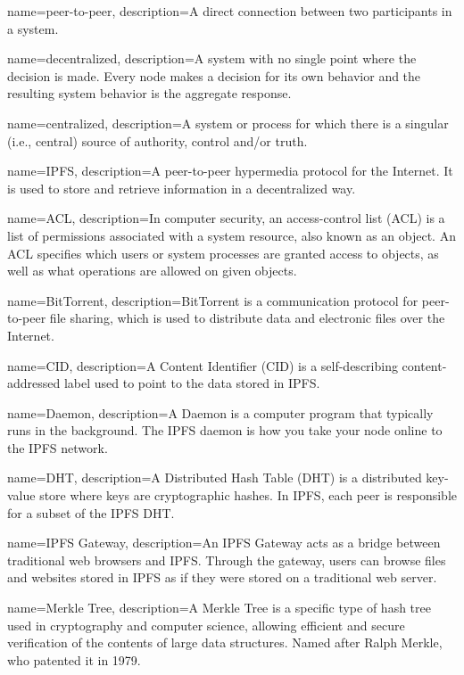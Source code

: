  {
	name=peer-to-peer,
	description={A direct connection between two participants in a system.}
}

 {
	name=decentralized,
	description={A system with no single point where the decision is made. Every node makes a decision for its own behavior and the resulting system behavior is the aggregate response.}
}

 {
	name=centralized,
	description={A system or process for which there is a singular (i.e., central) source of authority, control and/or truth.}
}

 {
	name=IPFS,
	description={A peer-to-peer hypermedia protocol for the Internet. It is used to store and retrieve information in a decentralized way.}
}

 {
	name=ACL,
	description={In computer security, an access-control list (ACL) is a list of permissions associated with a system resource, also known as an object. An ACL specifies which users or system processes are granted access to objects, as well as what operations are allowed on given objects.}
}

 {
	name=BitTorrent,
	description={BitTorrent is a communication protocol for peer-to-peer file sharing, which is used to distribute data and electronic files over the Internet.}
}

 {
	name=CID,
	description={A Content Identifier (CID) is a self-describing content-addressed label used to point to the data stored in IPFS.}
}

 {
	name=Daemon,
	description={A Daemon is a computer program that typically runs in the background. The IPFS daemon is how you take your node online to the IPFS network.}
}

 {
	name=DHT,
	description={A Distributed Hash Table (DHT) is a distributed key-value store where keys are cryptographic hashes. In IPFS, each peer is responsible for a subset of the IPFS DHT.}
}

 {
	name=IPFS Gateway,
	description={An IPFS Gateway acts as a bridge between traditional web browsers and IPFS. Through the gateway, users can browse files and websites stored in IPFS as if they were stored on a traditional web server.}
}

 {
	name=Merkle Tree,
	description={A Merkle Tree is a specific type of hash tree used in cryptography and computer science, allowing efficient and secure verification of the contents of large data structures. Named after Ralph Merkle, who patented it in 1979.}
}

